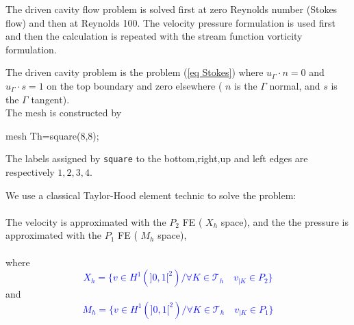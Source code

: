 \documentclass[twoside]{book}
\newif\ifpdf
\def\Blue#1{\textcolor{blue}{#1}}
\begin{document}
\graphicspath{{./}{plots/}}
\ifpdf
\DeclareGraphicsExtensions{.pdf, .jpg, .tif}
\else
{}
\fi

\let\subsubsection\subsection
\let\subsection\section
\let\section\chapter

\medskip



The driven cavity flow problem is solved first at zero Reynolds number
(Stokes flow) and then at Reynolds 100.  The
velocity pressure formulation is used first and then the calculation
is repeated with the stream function vorticity formulation.


The driven cavity problem is the problem (\ref{eq Stokes})  where
 $u_{\Gamma}\cdot n=0$ and $u_{\Gamma}\cdot s
=1$ on the top boundary and zero elsewhere ( $n$ is  the $\Gamma$ normal, and
 $s$ is the $\Gamma$ tangent).
\\
The mesh is constructed by
\bFF

mesh Th=square(8,8);
\eFF

The labels assigned by \texttt{square}
to the bottom,right,up and left edges are respectively $1,2,3,4$.

We use a classical Taylor-Hood element technic to solve the problem:
\\\\
The velocity is approximated with the $P_{2}$ FE ( $X_{h}$ space), and the
the pressure is approximated with the $P_{1}$ FE ( $M_{h}$ space),
\\\\
where
\Blue{
$$  X_{h} = \{ v \in H^{1}(]0,1[^2) / \forall K \in \mathcal{T}_{h}
\quad v_{|K} \in
P_{2} \}$$} and
\Blue{$$  M_{h} = \{ v \in H^{1}(]0,1[^2) / \forall K \in \mathcal{T}_{h}
\quad v_{|K} \in
P_{1} \}$$}
\end{document}
